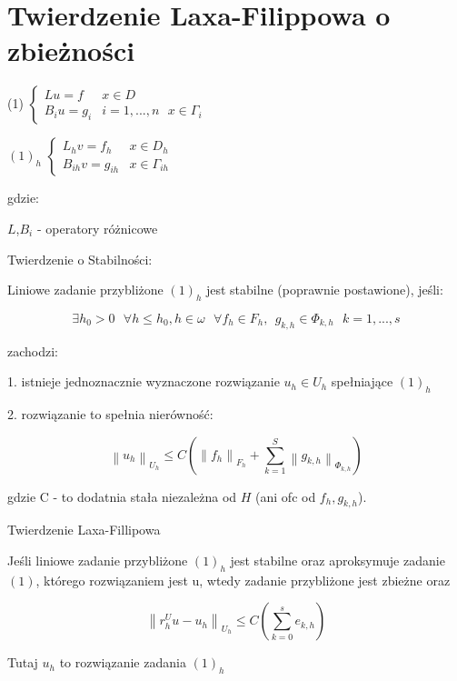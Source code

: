 \section{Twierdzenie Laxa-Filippowa o zbieżności}

(1) $\left\{\begin{matrix} Lu = f & x \in D \\ B_iu = g_i & i = 1,...,n\ \ \ x \in \Gamma _i \end{matrix}\right.$

$(1)_h$ $\left\{\begin{matrix} L_hv = f_h & x \in D_h \\ B_{ih} v = g_{ih} & x \in \Gamma _{ih} \end{matrix}\right.$

gdzie:

$L$,$B_i$ - operatory różnicowe

Twierdzenie o Stabilności:

Liniowe zadanie przybliżone $(1)_h$ jest stabilne (poprawnie postawione), jeśli:

\[ \exists h_0 > 0 \ \ \ \forall h \leqslant h_0 , h \in \omega \ \ \ \forall f_h \in F_h,\ \  g_{k,h} \in \Phi _{k,h}\ \ \ k = 1,...,s\]

zachodzi:

1. istnieje jednoznacznie wyznaczone rozwiązanie $u_h \in U_h$ spełniające $(1)_h$

2. rozwiązanie to spełnia nierówność:

\[ \left \| u_h \right  \|_{U_h} \leqslant C(\left \| f_h \right \|_{F_h} + \sum_{k=1}^S \left \| g_{k,h} \right \|_{\Phi _{k,h}}) \]

gdzie C - to dodatnia stała niezależna od $H$ (ani ofc od $f_h, g_{k,h}$).

Twierdzenie Laxa-Fillipowa

Jeśli liniowe zadanie przybliżone $(1)_h$ jest stabilne oraz aproksymuje zadanie $(1)$, którego rozwiązaniem jest u, wtedy zadanie przybliżone jest zbieżne oraz

\[ \left \| r_h^U u - u_h \right \|_{U_h} \leqslant C(\sum_{k=0}^{s} e_{k,h}) \]

Tutaj $u_h$ to rozwiązanie zadania $(1)_h$